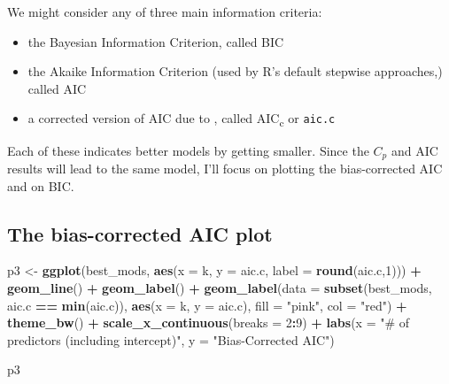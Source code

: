 \documentclass[]{book}
\newenvironment{Shaded}{\begin{snugshade}}{\end{snugshade}}
\newcommand{\KeywordTok}[1]{\textcolor[rgb]{0.13,0.29,0.53}{\textbf{#1}}}
\newcommand{\DataTypeTok}[1]{\textcolor[rgb]{0.13,0.29,0.53}{#1}}
\newcommand{\DecValTok}[1]{\textcolor[rgb]{0.00,0.00,0.81}{#1}}
\newcommand{\StringTok}[1]{\textcolor[rgb]{0.31,0.60,0.02}{#1}}
\newcommand{\OperatorTok}[1]{\textcolor[rgb]{0.81,0.36,0.00}{\textbf{#1}}}
\newcommand{\NormalTok}[1]{#1}
\providecommand{\tightlist}{%
  \setlength{\itemsep}{0pt}\setlength{\parskip}{0pt}}
\theoremstyle{definition}
\theoremstyle{definition}
\theoremstyle{definition}
\theoremstyle{remark}
\begin{document}
We might consider any of three main information criteria:

\begin{itemize}
\tightlist
\item
  the Bayesian Information Criterion, called BIC
\item
  the Akaike Information Criterion (used by R's default stepwise
  approaches,) called AIC
\item
  a corrected version of AIC due to \citet{HurvichTsai1989}, called
  AIC\textsubscript{c} or \texttt{aic.c}
\end{itemize}

Each of these indicates better models by getting smaller. Since the
\(C_p\) and AIC results will lead to the same model, I'll focus on
plotting the bias-corrected AIC and on BIC.

\subsection{The bias-corrected AIC
plot}\label{the-bias-corrected-aic-plot}

\begin{Shaded}
\begin{Highlighting}[]
\NormalTok{p3 <-}\StringTok{ }\KeywordTok{ggplot}\NormalTok{(best_mods, }\KeywordTok{aes}\NormalTok{(}\DataTypeTok{x =}\NormalTok{ k, }\DataTypeTok{y =}\NormalTok{ aic.c,}
                             \DataTypeTok{label =} \KeywordTok{round}\NormalTok{(aic.c,}\DecValTok{1}\NormalTok{))) }\OperatorTok{+}
\StringTok{    }\KeywordTok{geom_line}\NormalTok{() }\OperatorTok{+}
\StringTok{    }\KeywordTok{geom_label}\NormalTok{() }\OperatorTok{+}
\StringTok{    }\KeywordTok{geom_label}\NormalTok{(}\DataTypeTok{data =} \KeywordTok{subset}\NormalTok{(best_mods, aic.c }\OperatorTok{==}\StringTok{ }\KeywordTok{min}\NormalTok{(aic.c)),}
               \KeywordTok{aes}\NormalTok{(}\DataTypeTok{x =}\NormalTok{ k, }\DataTypeTok{y =}\NormalTok{ aic.c), }\DataTypeTok{fill =} \StringTok{"pink"}\NormalTok{, }
               \DataTypeTok{col =} \StringTok{"red"}\NormalTok{) }\OperatorTok{+}
\StringTok{    }\KeywordTok{theme_bw}\NormalTok{() }\OperatorTok{+}
\StringTok{    }\KeywordTok{scale_x_continuous}\NormalTok{(}\DataTypeTok{breaks =} \DecValTok{2}\OperatorTok{:}\DecValTok{9}\NormalTok{) }\OperatorTok{+}
\StringTok{    }\KeywordTok{labs}\NormalTok{(}\DataTypeTok{x =} \StringTok{"# of predictors (including intercept)"}\NormalTok{,}
         \DataTypeTok{y =} \StringTok{"Bias-Corrected AIC"}\NormalTok{)}

\NormalTok{p3}
\end{Highlighting}
\end{Shaded}
\end{document}
